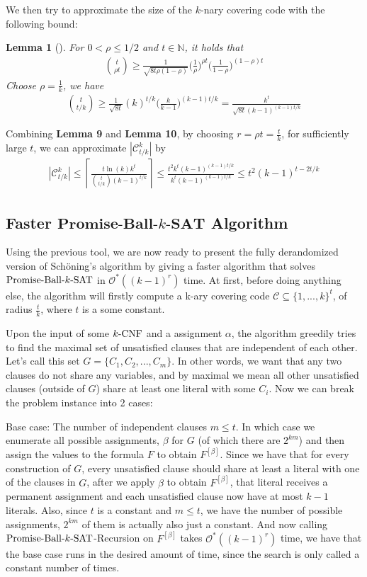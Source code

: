 \documentclass[a4paper,12pts]{article}
\newcommand{\SAT}{\textnormal{$k$-SAT}}
\newcommand{\SATbf}{\textbf{$k$-SAT}}
\newcommand{\CNF}{\textnormal{$k$-CNF}}
\newcommand{\PBS}{\textnormal{Promise-Ball-$\SAT$}}
\newcommand{\PBSbf}{\textbf{Promise-Ball-$\SATbf$}}
\newcommand{\cc}{\mathcal{C}}
\newcommand{\kbits}{\{1,...,k\}}
\renewcommand{\O}{\mathcal{O}^*}
\newtheorem{lemma}{Lemma}
\begin{document}
We then try to approximate the size of the $k$-nary covering code with the following bound:
\begin{lemma}[\cite{MacWilliams77}]
	For $0<\rho \le 1/2$ and $t \in \mathbb{N}$, it holds that
	\begin{align*}
	{t \choose \rho t}\geq \frac{1}{\sqrt{8t\rho(1-\rho)}}\Big(\frac{1}{\rho}\Big)^{\rho t}\Big(\frac{1}{1-\rho}\Big)^{(1-\rho) t}
	\end{align*} 
	Choose $\rho = \frac{1}{k}$, we have
	\begin{align*}
	{t \choose t/k}\geq \frac{1}{\sqrt{8t}}(k)^{t/k}\Big(\frac{k}{k-1}\Big)^{(k-1) t/k} = \frac{k^t}{\sqrt{8t}(k-1)^{(k-1)t/k}}
	\end{align*} 
\end{lemma}
Combining \textbf{Lemma 9} and \textbf{Lemma 10}, by choosing $r = \rho t = \frac{t}{k}$, for sufficiently large $t$, we can approximate $|\cc^k_{t/k}|$ by
\begin{align*}
|\cc^k_{{t/k}}| \leq \left \lceil \frac{t\ln(k)k^t}{{t \choose t/k}(k-1)^{t/k}} \right \rceil \leq \frac{t^2 k^t (k-1)^{(k-1)t/k}}{k^t(k-1)^{(k-1)t/k}} \leq t^2(k-1)^{t-2t/k}
\end{align*}
\subsection{Faster $\PBSbf$ Algorithm}
Using the previous tool, we are now ready to present the fully derandomized version of Sch\"{o}ning's algorithm by giving a faster algorithm that solves $\PBS$ in $\O((k-1)^r)$ time. At first, before doing anything else, the algorithm will firstly compute a k-ary covering code $\mathcal{C} \subseteq \kbits^{t}$, of radius $\frac{t}{k}$, where $t$ is a some constant.\par

Upon the input of some $\CNF$ and a assignment $\alpha$, the algorithm greedily tries to find the maximal set of unsatisfied clauses that are independent of each other. Let's call this set $G = \{C_1, C_2, ...,C_m\}$. In other words, we want that any two clauses do not share any variables, and by maximal we mean all other unsatisfied clauses (outside of $G$) share at least one literal with some $C_i$. Now we can break the problem instance into 2 cases: \par

Base case: The number of independent clauses $m \leq t$. In which case we enumerate all possible assignments, $\beta$ for $G$ (of which there are $2^{km}$) and then assign the values to the formula $F$ to obtain $F^{[\beta]}$. Since we have that for every construction of $G$, every unsatisfied clause should share at least a literal with one of the clauses in $G$, after we apply $\beta$ to obtain $F^{[\beta]}$, that literal receives a permanent assignment and each unsatisfied clause now have at most $k-1$ literals. Also, since $t$ is a constant and $m \leq t$, we have the number of possible assignments, $2^{km}$ of them is actually also just a constant. And now calling $\PBS$-Recursion on $F^{[\beta]}$ takes $\O((k-1)^r)$ time, we have that the base case runs in the desired amount of time, since the search is only called a constant number of times.\par
\end{document}
